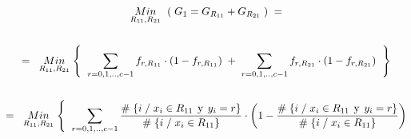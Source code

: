 \documentclass[
  11pt,
  a4paper,
]{article}
\begin{document}
\begin{gather*}
\underset{R_{11}  ,  R_{21}}  {Min} \hspace{0.15cm} \left(\hspace{0.1cm} G_1 = G_{R_{11}} + G_{R_{21}}  \hspace{0.1cm}\right)   \hspace{0.1cm} =   \\ \\
=\hspace{0.2cm} \underset{R_{11}  ,  R_{21}}  {Min} \hspace{0.1cm} \Biggl\{ \hspace{0.2cm}  \sum_{r=0,1,..,c-1}^{} f_{r , R_{11}}\cdot(1 - f_{r , R_{11}})  \hspace{0.1cm} + \hspace{0.1cm}  \sum_{r=0,1,..,c-1}^{} f_{r , R_{21}}\cdot(1 - f_{r , R_{21}})   \hspace{0.2cm} \Biggl\}     \\ \\ 
=\hspace{0.2cm}   \underset{R_{11}  ,  R_{21}}  {Min} \hspace{0.1cm} \Biggl\{\hspace{0.2cm}   \sum_{r=0,1,..,c-1}^{}  \dfrac{\# \hspace{0.1 cm}\lbrace i \hspace{0.1 cm}/\hspace{0.1 cm} x_i \in R_{11} \hspace{0.15 cm}\text{y}\hspace{0.15 cm} y_i = r  \rbrace}{\# \hspace{0.1 cm}\lbrace i \hspace{0.1 cm}/\hspace{0.1 cm} x_i \in R_{11}  \rbrace}  \cdot \left(   1 - \dfrac{\# \hspace{0.1 cm}\lbrace i \hspace{0.1 cm}/\hspace{0.1 cm} x_i \in R_{11} \hspace{0.15 cm}\text{y}\hspace{0.15 cm} y_i = r  \rbrace}{\# \hspace{0.1 cm}\lbrace i \hspace{0.1 cm}/\hspace{0.1 cm} x_i \in R_{11}  \rbrace}  \right) \\ \\

\end{gather*}
\end{document}
